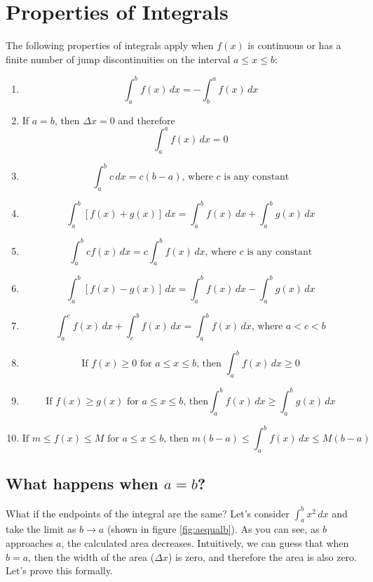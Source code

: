 \section{Properties of Integrals}
The following properties of integrals apply when $f(x)$ is continuous 
or has a finite number of jump discontinuities on the interval $a 
\leq x \leq b$:
\begin{enumerate}
\item $$\int_{a}^{b} f(x)\,dx = - \int_{b}^{a} f(x)\,dx$$ 
\item If $a = b$, then $\Delta x = 0$ and therefore $$\int_{a}^{a} 
f(x)\,dx = 0$$%
\item $$\int_{a}^{b} c\,dx = c (b - a) \text{, where } c 
\text{ is any constant}$$%
\item $$\int_{a}^{b}[f(x) + g(x)]\,dx = \int_{a}^{b} f(x)\,dx + 
\int_{a}^{b} g(x)\,dx$$%
\item $$\int_{a}^{b} c f(x)\,dx = c \int_{a}^{b} f(x)\,dx
\text{, where } c \text{ is any constant}$$%
\item $$\int_{a}^{b}[f(x) - g(x)]\,dx = \int_{a}^{b} f(x)\,dx - 
\int_{a}^{b} g(x)\,dx$$%
\item $$\int_{a}^{c} f(x)\,dx + \int_{c}^{b} f(x)\,dx = 
\int_{a}^{b} f(x)\,dx \text{, where } a < c < b$$%
\item $$\text{If } f(x) \geq 0 \text{ for } a \leq x \leq b 
\text{, then } \int_{a}^{b} f(x)\,dx \geq 0$$%
\item $$\text{If } f(x) \geq g(x) \text{ for } a \leq x \leq b 
\text{, then} \int_{a}^{b} f(x)\,dx \geq \int_{a}^{b} g(x)\,dx$$
\item $$\text{If } m \leq f(x) \leq M \text{ for }a \leq x \leq b 
\text{, then } m (b - a) \leq \int_{a}^{b} f(x)\,dx \leq M (b - a)$$
\end{enumerate}

\subsection{What happens when $a=b$?}

What if the endpoints of the integral are the same? Let's consider 
$\int_a^b x^2\,dx$ and take the limit as $b \to a$ (shown in figure 
\ref{fig:aequalb}). As you can see, as $b$ approaches $a$, the 
calculated area decreases. Intuitively, we can guess that when $b=a$, 
then the width of the area ($\Delta x$) is zero, and therefore the 
area is also zero. Let's prove this formally. 

